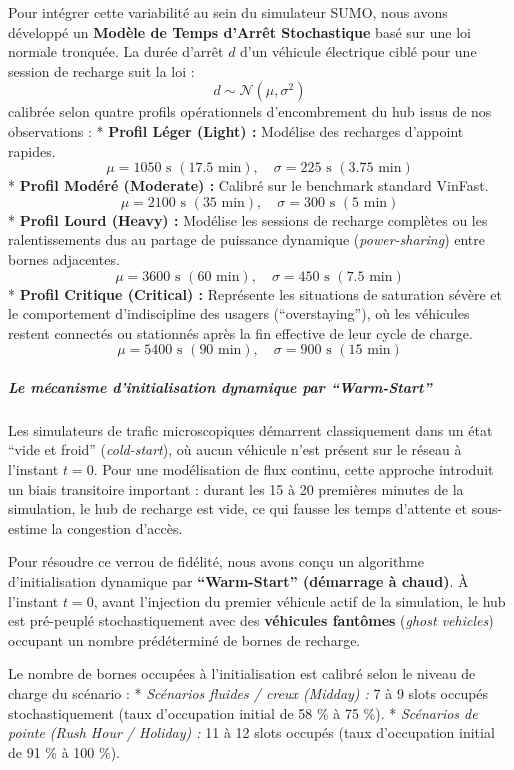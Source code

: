 \documentclass[10pt, a4paper]{article}
\begin{document}
Pour intégrer cette variabilité au sein du simulateur SUMO, nous avons
développé un \textbf{Modèle de Temps d'Arrêt Stochastique} basé sur une
loi normale tronquée. La durée d'arrêt \(d\) d'un véhicule électrique
ciblé pour une session de recharge suit la loi :
\[d \sim \mathcal{N}(\mu, \sigma^2)\] calibrée selon quatre profils
opérationnels d'encombrement du hub issus de nos observations : *
\textbf{Profil Léger (Light) :} Modélise des recharges d'appoint
rapides.
\[\mu = 1050 \text{ s } (17.5 \text{ min}), \quad \sigma = 225 \text{ s } (3.75 \text{ min})\]
* \textbf{Profil Modéré (Moderate) :} Calibré sur le benchmark standard
VinFast.
\[\mu = 2100 \text{ s } (35 \text{ min}), \quad \sigma = 300 \text{ s } (5 \text{ min})\]
* \textbf{Profil Lourd (Heavy) :} Modélise les sessions de recharge
complètes ou les ralentissements dus au partage de puissance dynamique
(\emph{power-sharing}) entre bornes adjacentes.
\[\mu = 3600 \text{ s } (60 \text{ min}), \quad \sigma = 450 \text{ s } (7.5 \text{ min})\]
* \textbf{Profil Critique (Critical) :} Représente les situations de
saturation sévère et le comportement d'indiscipline des usagers
(``overstaying''), où les véhicules restent connectés ou stationnés
après la fin effective de leur cycle de charge.
\[\mu = 5400 \text{ s } (90 \text{ min}), \quad \sigma = 900 \text{ s } (15 \text{ min})\]

\subparagraph{Le mécanisme d'initialisation dynamique par
``Warm-Start''}\label{le-muxe9canisme-dinitialisation-dynamique-par-warm-start}

Les simulateurs de trafic microscopiques démarrent classiquement dans un
état ``vide et froid'' (\emph{cold-start}), où aucun véhicule n'est
présent sur le réseau à l'instant \(t = 0\). Pour une modélisation de
flux continu, cette approche introduit un biais transitoire important :
durant les 15 à 20 premières minutes de la simulation, le hub de
recharge est vide, ce qui fausse les temps d'attente et sous-estime la
congestion d'accès.

Pour résoudre ce verrou de fidélité, nous avons conçu un algorithme
d'initialisation dynamique par \textbf{``Warm-Start'' (démarrage à
chaud)}. À l'instant \(t=0\), avant l'injection du premier véhicule
actif de la simulation, le hub est pré-peuplé stochastiquement avec des
\textbf{véhicules fantômes} (\emph{ghost vehicles}) occupant un nombre
prédéterminé de bornes de recharge.

Le nombre de bornes occupées à l'initialisation est calibré selon le
niveau de charge du scénario : * \emph{Scénarios fluides / creux
(Midday) :} 7 à 9 slots occupés stochastiquement (taux d'occupation
initial de 58 \% à 75 \%). * \emph{Scénarios de pointe (Rush Hour /
Holiday) :} 11 à 12 slots occupés (taux d'occupation initial de 91 \% à
100 \%).
\end{document}
